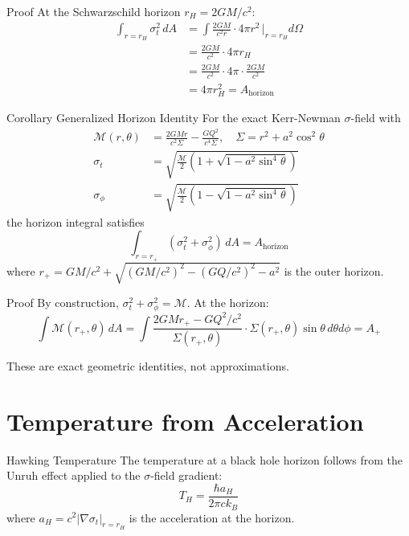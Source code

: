 \documentclass[11pt,a4paper]{article}
\theoremstyle{definition}
\theoremstyle{remark}
\begin{document}
	Proof
		At the Schwarzschild horizon $r_H = 2GM/c^2$:
		\begin{align}
			\int_{r=r_H} \sigma_t^2 \, dA &= \int \frac{2GM}{c^2 r} \cdot 4\pi r^2 \, \bigg|_{r=r_H} d\Omega\\
			&= \frac{2GM}{c^2} \cdot 4\pi r_H\\
			&= \frac{2GM}{c^2} \cdot 4\pi \cdot \frac{2GM}{c^2}\\
			&= 4\pi r_H^2 = A_{\text{horizon}}
		\end{align}
	
	Corollary Generalized Horizon Identity
		For the exact Kerr-Newman $\sigma$-field with
		\begin{align}
			\mathcal{M}(r,\theta) &= \frac{2GMr}{c^2\Sigma} - \frac{GQ^2}{c^4\Sigma}, \quad \Sigma = r^2 + a^2\cos^2\theta\\
			\sigma_t &= \sqrt{\frac{\mathcal{M}}{2}\left(1 + \sqrt{1-a^2\sin^4\theta}\right)}\\
			\sigma_\phi &= \sqrt{\frac{\mathcal{M}}{2}\left(1 - \sqrt{1-a^2\sin^4\theta}\right)}
		\end{align}
		the horizon integral satisfies
		\begin{equation}
			\int_{r=r_+} (\sigma_t^2 + \sigma_\phi^2) \, dA = A_{\text{horizon}}
		\end{equation}
		where $r_+ = GM/c^2 + \sqrt{(GM/c^2)^2 - (GQ/c^2)^2 - a^2}$ is the outer horizon.
	
	Proof
		By construction, $\sigma_t^2 + \sigma_\phi^2 = \mathcal{M}$. At the horizon:
		\begin{equation}
			\int \mathcal{M}(r_+, \theta) \, dA = \int \frac{2GMr_+ - GQ^2/c^2}{\Sigma(r_+, \theta)} \cdot \Sigma(r_+,\theta) \sin\theta \, d\theta d\phi = A_+
		\end{equation}
	
	These are exact geometric identities, not approximations.
	
	\section{Temperature from Acceleration}
	
	Hawking Temperature
		The temperature at a black hole horizon follows from the Unruh effect applied to the $\sigma$-field gradient:
		\begin{equation}
			T_H = \frac{\hbar a_H}{2\pi c k_B}
		\end{equation}
		where $a_H = c^2 |\nabla \sigma_t|_{r=r_H}$ is the acceleration at the horizon.
	
\end{document}
